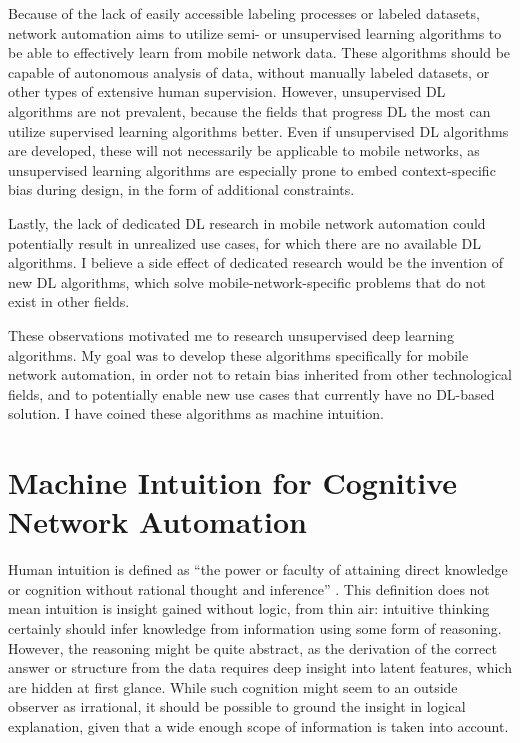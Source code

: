 			Because of the lack of easily accessible labeling processes or labeled datasets, network automation aims to utilize semi- or unsupervised learning algorithms to be able to effectively learn from mobile network data.	
			These algorithms should be capable of autonomous analysis of data, without manually labeled datasets, or other types of extensive human supervision.
			However, unsupervised \ac{DL} algorithms are not prevalent, because the fields that progress \ac{DL} the most can utilize supervised learning algorithms better.
			Even if unsupervised \ac{DL} algorithms are developed, these will not necessarily be applicable to mobile networks, as unsupervised learning algorithms are especially prone to embed context-specific bias during design, in the form of additional constraints.
			
			Lastly, the lack of dedicated \ac{DL} research in mobile network automation could potentially result in unrealized use cases, for which there are no available \ac{DL} algorithms.
			I believe a side effect of dedicated research would be the invention of new \ac{DL} algorithms, which solve mobile-network-specific problems that do not exist in other fields.
			
			These observations motivated me to research unsupervised deep learning algorithms.
			My goal was to develop these algorithms specifically for mobile network automation, in order not to retain bias inherited from other technological fields, and to potentially enable new use cases that currently have no \ac{DL}-based solution.
			I have coined these algorithms as machine intuition.
		
	\section{Machine Intuition for Cognitive Network Automation}
	
		Human intuition is defined as ``the power or faculty of attaining direct knowledge or cognition without  rational thought and inference'' \cite{mw_intuition}.
		This definition does not mean intuition is insight gained without logic, from thin air: intuitive thinking certainly should infer knowledge from information using some form of reasoning.
		However, the reasoning might be quite abstract, as the derivation of the correct answer or structure from the data requires deep insight into latent features, which are hidden at first glance.
		While such cognition might seem to an outside observer as irrational, it should be possible to ground the insight in logical explanation, given that a wide enough scope of information is taken into account.
		
